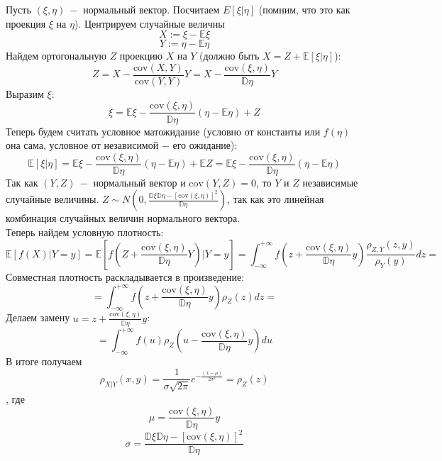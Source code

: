 \begin{example}
Пусть $\left(\xi, \eta\right) \ - $ нормальный вектор. Посчитаем $E\left[\xi | \eta\right]$ (помним, что это как проекция $\xi$ на $\eta$). Центрируем случайные величны
\[
    X := \xi - \mathbb{E} \xi
\]
\[
    Y := \eta - \mathbb{E} \eta
\]
Найдем ортогональную $Z$ проекцию $X$ на $Y$ (должно быть $X = Z + \mathbb{E}\left[\xi | \eta\right]$):
\[
    Z = X - \frac{\text{cov}\left(X, Y\right)}{\text{cov}\left(Y, Y\right)}Y = 
    X - \frac{\text{cov}\left(\xi, \eta\right)}{\mathbb{D}\eta}Y
\]
Выразим $\xi$:
\[
    \xi = \mathbb{E} \xi - \frac{\text{cov}\left(\xi, \eta\right)}{\mathbb{D}\eta}\left(\eta - \mathbb{E} \eta\right) + Z
\]
Теперь будем считать условное матожидание (условно от константы или $f\left(\eta\right)$ она сама, условное от независимой $-$ его ожидание):
\[
    \mathbb{E}\left[\xi | \eta\right] = \mathbb{E}\xi - \frac{\text{cov}\left(\xi, \eta\right)}{\mathbb{D}\eta}\left(\eta - \mathbb{E} \eta\right) + \mathbb{E} Z = \mathbb{E}\xi - \frac{\text{cov}\left(\xi, \eta\right)}{\mathbb{D}\eta}\left(\eta - \mathbb{E} \eta\right)
\]
Так как $\left(Y, Z\right) \ -$ нормальный вектор и $\text{cov}\left(Y, Z\right) = 0$, то $Y$ и $Z$ независимые случайные величины. $Z \sim N\left(0, \frac{\mathbb{D} \xi \mathbb{D} \eta - \left[\text{cov}\left(\xi, \eta\right)\right] ^ 2}{\mathbb{D} \eta}\right)$, так как это линейная комбинация случайных величин нормального вектора. \\
Теперь найдем условную плотность:
\[
    \mathbb{E}\left[f\left(X\right) | Y = y\right] = \mathbb{E} \left[f\left(Z + \frac{\text{cov}\left(\xi, \eta\right)}{\mathbb{D}\eta}Y\right) | Y = y\right] = \int_{-\infty}^{+\infty} f\left(z + \frac{\text{cov}\left(\xi, \eta\right)}{\mathbb{D}\eta}y\right) \frac{\rho_{Z, Y}\left(z, y\right)}{\rho_{Y}\left(y\right)} dz = 
\]
Совместная плотность раскладывается в произведение:
\[
    = \int_{-\infty}^{+\infty} f\left(z + \frac{\text{cov}\left(\xi, \eta\right)}{\mathbb{D}\eta}y\right) \rho_{Z}\left(z\right) dz = 
\]
Делаем замену $u = z + \frac{\text{cov}\left(\xi, \eta\right)}{\mathbb{D}\eta}y$:
\[
    = \int_{-\infty}^{+\infty} f\left(u\right) \rho_Z\left(u - \frac{\text{cov}\left(\xi, \eta\right)}{\mathbb{D}\eta} y\right) du
\]
В итоге получаем
\[
    \rho_{X|Y}\left(x, y\right) = \frac{1}{\sigma \sqrt{2\pi}} e ^ {-\frac{\left(x - \mu\right)}{2 \sigma ^ 2}} = \rho_{Z}\left(z \right)
\], где
\[
    \mu  = \frac{\text{cov}\left(\xi, \eta\right)}{\mathbb{D}\eta} y
\]
\[
    \sigma = \frac{\mathbb{D} \xi \mathbb{D} \eta - \left[\text{cov}\left(\xi, \eta\right)\right] ^ 2}{\mathbb{D} \eta}
\]
\end{example}

